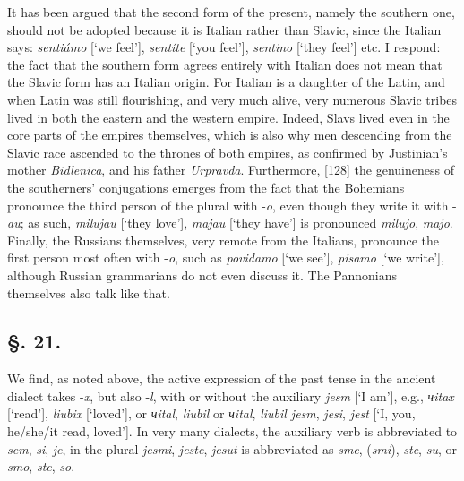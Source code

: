 It has been argued that the second form of the present, namely the southern one, should not be adopted because it is Italian rather than Slavic, since the Italian says: \textit{sentiámo} [‘we feel’], \textit{sentíte} [‘you feel’], \textit{sentino} [‘they feel’] etc. I respond: the fact that the southern form agrees entirely with Italian does not mean that the Slavic form has an Italian origin. For Italian is a daughter of the Latin, and when Latin was still flourishing, and very much alive, very numerous Slavic tribes lived in both the eastern and the western empire. Indeed, Slavs lived even in the core parts of the empires themselves, which is also why men descending from the Slavic race ascended to the thrones of both empires, as confirmed by Justinian’s mother \textit{Bidlenica}, and his father \textit{Urpravda}. Furthermore, [128] the genuineness of the southerners’ conjugations emerges from the fact that the Bohemians pronounce the third person of the plural with -\textit{o}, even though they write it with -\textit{au}; as such, \textit{milujau} [‘they love’], \textit{majau} [‘they have’] is pronounced \textit{milujo}, \textit{majo}. Finally, the Russians themselves, very remote from the Italians, pronounce the first person most often with -\textit{o}, such as \textit{povidamo} [‘we see’], \textit{pisamo} [‘we write’], although Russian grammarians do not even discuss it. The Pannonians themselves also talk like that.

\subsection*{\hspace*{\fill}§. 21.\hspace*{\fill}}

We find, as noted above, the active expression of the past tense in the ancient dialect takes -\textit{x}, but also -\textit{l}, with or without the auxiliary \textit{jesm} [‘I am’], e.g., \textit{чitax} [‘read’], \textit{liubix} [‘loved’], or \textit{чital}, \textit{liubil} or \textit{чital}, \textit{liubil jesm}, \textit{jesi}, \textit{jest} [‘I, you, he/she/it read, loved’]. In very many dialects, the auxiliary verb is abbreviated to \textit{sem}, \textit{si}, \textit{je}, in the plural \textit{jesmi}, \textit{jeste}, \textit{jesut} is abbreviated as \textit{sme}, (\textit{smi}), \textit{ste}, \textit{su}, or \textit{smo}, \textit{ste}, \textit{so}.

